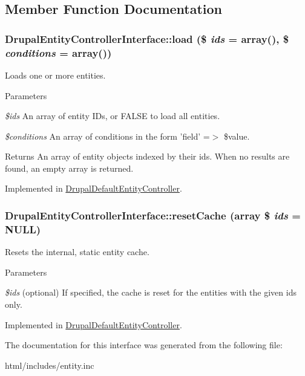 \subsection{Member Function Documentation}
\hypertarget{interfaceDrupalEntityControllerInterface_acc6ec97b35f4d32680c0d2ba090f7389}{
\subsubsection[{load}]{\setlength{\rightskip}{0pt plus 5cm}DrupalEntityControllerInterface::load (\$ {\em ids} = {\ttfamily array()}, \/  \$ {\em conditions} = {\ttfamily array()})}}
\label{interfaceDrupalEntityControllerInterface_acc6ec97b35f4d32680c0d2ba090f7389}
Loads one or more entities.


\begin{DoxyParams}{Parameters}
\item[{\em \$ids}]An array of entity IDs, or FALSE to load all entities. \item[{\em \$conditions}]An array of conditions in the form 'field' =$>$ \$value.\end{DoxyParams}
\begin{DoxyReturn}{Returns}
An array of entity objects indexed by their ids. When no results are found, an empty array is returned. 
\end{DoxyReturn}


Implemented in \hyperlink{classDrupalDefaultEntityController_a523544ab73cba6994201afa89b0fb0c7}{DrupalDefaultEntityController}.\hypertarget{interfaceDrupalEntityControllerInterface_ae735484b175ff431b7b104732b7a497b}{
\subsubsection[{resetCache}]{\setlength{\rightskip}{0pt plus 5cm}DrupalEntityControllerInterface::resetCache (array \$ {\em ids} = {\ttfamily NULL})}}
\label{interfaceDrupalEntityControllerInterface_ae735484b175ff431b7b104732b7a497b}
Resets the internal, static entity cache.


\begin{DoxyParams}{Parameters}
\item[{\em \$ids}](optional) If specified, the cache is reset for the entities with the given ids only. \end{DoxyParams}


Implemented in \hyperlink{classDrupalDefaultEntityController_a4d64a900a78ece5d4acc569000b69270}{DrupalDefaultEntityController}.

The documentation for this interface was generated from the following file:\begin{DoxyCompactItemize}
\item 
html/includes/entity.inc\end{DoxyCompactItemize}
